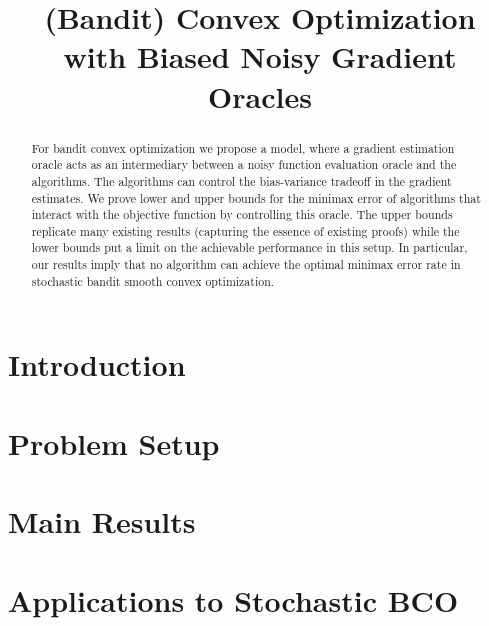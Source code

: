 \documentclass{article} %
\title{(Bandit) Convex Optimization with Biased Noisy Gradient Oracles}
\author{
}%
\begin{document}
\maketitle


\begin{abstract} 
For bandit convex optimization we propose a model, 
where a gradient estimation oracle acts as an intermediary between 
a noisy function evaluation oracle and the algorithms. 
The algorithms can control the bias-variance tradeoff in the gradient
estimates. We prove lower and upper bounds for the minimax
error of algorithms that interact with the objective function
by controlling this oracle. The upper bounds replicate many
existing results (capturing the essence of existing proofs)
while the lower bounds put a limit on the achievable performance
in this setup. In particular, our results imply that no algorithm 
can achieve the optimal minimax error rate in 
stochastic bandit smooth convex optimization.
\end{abstract} 


\section{Introduction}
\label{sec:intro}


\section{Problem Setup}
\label{sec:problem}


\section{Main Results}
\label{sec:results}


\section{Applications to Stochastic BCO}
\label{sec:sbco}

\end{document}
